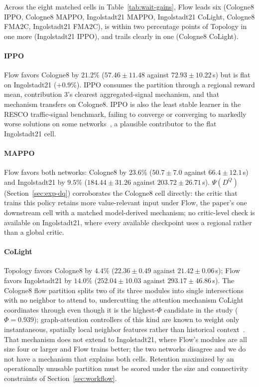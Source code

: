 \documentclass[journal]{IEEEtran}
\theoremstyle{definition}
\begin{document}
Across the eight matched cells in Table~\ref{tab:wait-gains}, Flow leads six (Cologne8 IPPO, Cologne8 MAPPO, Ingolstadt21 MAPPO, Ingolstadt21 CoLight, Cologne8 FMA2C, Ingolstadt21 FMA2C), is within two percentage points of Topology in one more (Ingolstadt21 IPPO), and trails clearly in one (Cologne8 CoLight).

\paragraph{IPPO}
Flow favors Cologne8 by $21.2\%$ ($57.46\pm11.48$ against $72.93\pm10.22$\,s) but is flat on Ingolstadt21 ($+0.9\%$). IPPO consumes the partition through a regional reward mean, contribution 3's clearest aggregated-signal mechanism, and that mechanism transfers on Cologne8.
IPPO is also the least stable learner in the RESCO traffic-signal benchmark, failing to converge or converging to markedly worse solutions on some networks~\citep{ault2021resco}, a plausible contributor to the flat Ingolstadt21 cell.

\paragraph{MAPPO}
Flow favors both networks: Cologne8 by $23.6\%$ ($50.7\pm7.0$ against $66.4\pm12.1$\,s) and Ingolstadt21 by $9.5\%$ ($184.44\pm31.26$ against $203.72\pm26.71$\,s). $\Psi(D^Q)$ (Section~\ref{sec:exp-dq}) corroborates the Cologne8 cell directly: the critic that trains this policy retains more value-relevant input under Flow, the paper's one downstream cell with a matched model-derived mechanism; no critic-level check is available on Ingolstadt21, where every available checkpoint uses a regional rather than a global critic.

\paragraph{CoLight}
Topology favors Cologne8 by $4.4\%$ ($22.36\pm0.49$ against $21.42\pm0.06$\,s); Flow favors Ingolstadt21 by $14.0\%$ ($252.04\pm10.03$ against $293.17\pm46.86$\,s).
The Cologne8 flow partition splits two of its three modules into single intersections with no neighbor to attend to, undercutting the attention mechanism CoLight coordinates through even though it is the highest-$\Phi$ candidate in the study ($\Phi=0.939$); graph-attention controllers of this kind are known to weight only instantaneous, spatially local neighbor features rather than historical context~\citep{lu2023dualight}. That mechanism does not extend to Ingolstadt21, where Flow's modules are all size four or larger and Flow trains better; the two networks disagree and we do not have a mechanism that explains both cells. Retention maximized by an operationally unusable partition must be scored under the size and connectivity constraints of Section~\ref{sec:workflow}.
\end{document}
